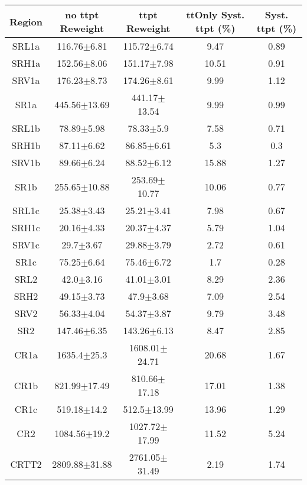 \documentclass[12pt]{paper}
\begin{document}
\begin{table}[ht]\begin{center}\resizebox{\textwidth}{!}
{\begin{tabular}{c|cccc}
    Region & no ttpt Reweight & ttpt Reweight & ttOnly Syst. ttpt (\%) & Syst. ttpt (\%)\\ 
\hline
SRL1a & 116.76$\pm$6.81 & 115.72$\pm$6.74 & 9.47 & 0.89\\ 
SRH1a & 152.56$\pm$8.06 & 151.17$\pm$7.98 & 10.51 & 0.91\\ 
SRV1a & 176.23$\pm$8.73 & 174.26$\pm$8.61 & 9.99 & 1.12\\ 
\hline
SR1a & 445.56$\pm$13.69 & 441.17$\pm$13.54 & 9.99 & 0.99\\ 
\hline
SRL1b & 78.89$\pm$5.98 & 78.33$\pm$5.9 & 7.58 & 0.71\\ 
SRH1b & 87.11$\pm$6.62 & 86.85$\pm$6.61 & 5.3 & 0.3\\ 
SRV1b & 89.66$\pm$6.24 & 88.52$\pm$6.12 & 15.88 & 1.27\\ 
\hline
SR1b & 255.65$\pm$10.88 & 253.69$\pm$10.77 & 10.06 & 0.77\\ 
\hline
SRL1c & 25.38$\pm$3.43 & 25.21$\pm$3.41 & 7.98 & 0.67\\ 
SRH1c & 20.16$\pm$4.33 & 20.37$\pm$4.37 & 5.79 & 1.04\\ 
SRV1c & 29.7$\pm$3.67 & 29.88$\pm$3.79 & 2.72 & 0.61\\ 
\hline
SR1c & 75.25$\pm$6.64 & 75.46$\pm$6.72 & 1.7 & 0.28\\ 
\hline
SRL2 & 42.0$\pm$3.16 & 41.01$\pm$3.01 & 8.29 & 2.36\\ 
SRH2 & 49.15$\pm$3.73 & 47.9$\pm$3.68 & 7.09 & 2.54\\ 
SRV2 & 56.33$\pm$4.04 & 54.37$\pm$3.87 & 9.79 & 3.48\\ 
\hline
SR2 & 147.46$\pm$6.35 & 143.26$\pm$6.13 & 8.47 & 2.85\\ 
\hline
\hline
CR1a & 1635.4$\pm$25.3 & 1608.01$\pm$24.71 & 20.68 & 1.67\\ 
CR1b & 821.99$\pm$17.49 & 810.66$\pm$17.18 & 17.01 & 1.38\\ 
CR1c & 519.18$\pm$14.2 & 512.5$\pm$13.99 & 13.96 & 1.29\\ 
CR2 & 1084.56$\pm$19.2 & 1027.72$\pm$17.99 & 11.52 & 5.24\\ 
CRTT2 & 2809.88$\pm$31.88 & 2761.05$\pm$31.49 & 2.19 & 1.74\\ 

\end{tabular}}
\end{center}\caption*{}\end{table}
\end{document}
